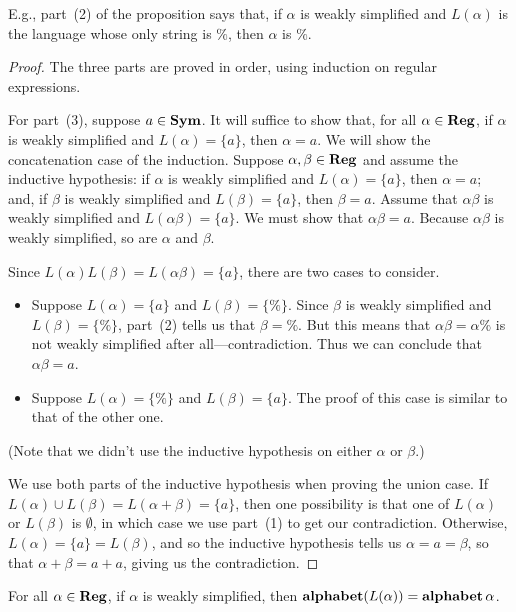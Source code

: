 E.g., part~(2) of the proposition says that, if $\alpha$
is weakly simplified and $L(\alpha)$ is the language whose only
string is $\%$, then $\alpha$ is $\%$.

\begin{proof}
The three parts are proved in order, using induction on regular
expressions.

For part~(3), suppose $a\in\mathbf{Sym}$. It will suffice to show that,
for all $\alpha\in\mathbf{Reg}$, if $\alpha$ is weakly simplified and
$L(\alpha)=\{a\}$, then $\alpha=a$.
We will show the concatenation case of the induction.  Suppose
$\alpha,\beta\in\mathbf{Reg}$ and assume the inductive hypothesis:
if $\alpha$ is weakly simplified and $L(\alpha)=\{a\}$,
then $\alpha=a$; and, if $\beta$ is weakly
simplified and $L(\beta)=\{a\}$, then $\beta=a$.
Assume that $\alpha\beta$ is weakly simplified and
$L(\alpha\beta)=\{a\}$.  We must show that $\alpha\beta=a$.  Because
$\alpha\beta$ is weakly simplified, so are $\alpha$ and $\beta$.

Since $L(\alpha)L(\beta)=L(\alpha\beta)=\{a\}$, there are two cases to
consider.
\begin{itemize}
\item Suppose $L(\alpha)=\{a\}$ and $L(\beta)=\{\%\}$.  Since $\beta$
  is weakly simplified and $L(\beta)=\{\%\}$, part~(2) tells us that
  $\beta=\%$.  But this means that $\alpha\beta=\alpha\%$ is not
  weakly simplified after all---contradiction.  Thus we can conclude
  that $\alpha\beta=a$.

\item Suppose $L(\alpha)=\{\%\}$ and $L(\beta)=\{a\}$.  The proof of
  this case is similar to that of the other one.
\end{itemize}
(Note that we didn't use the inductive hypothesis on either $\alpha$ or
$\beta$.)

We use both parts of the inductive hypothesis when proving the union
case. If $L(\alpha)\cup L(\beta) = L(\alpha+\beta)=\{a\}$, then one
possibility is that one of $L(\alpha)$ or $L(\beta)$ is $\emptyset$,
in which case we use part~(1) to get our contradiction. Otherwise,
$L(\alpha) = \{a\} = L(\beta)$, and so the inductive hypothesis tells
us $\alpha = a =\beta$, so that $\alpha+\beta = a + a$, giving us the
contradiction.
\end{proof}

\begin{proposition}
\label{WeakSimpProp2}
For all $\alpha\in\mathbf{Reg}$, if $\alpha$ is weakly simplified, then
$\mathbf{alphabet}(L(\alpha)) = \mathbf{alphabet}\,\alpha$.
\end{proposition}

